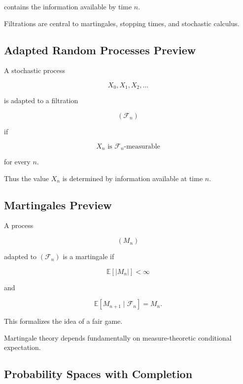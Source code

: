 contains the information available by time \(n\).

Filtrations are central to martingales, stopping times, and stochastic
calculus.

\subsection{Adapted Random Processes Preview}
\label{subsec:adapted-processes-preview}

A stochastic process

\[
X_0,X_1,X_2,\ldots
\]

is adapted to a filtration

\[
(\mathcal{F}_n)
\]

if

\[
\boxed{
X_n
\text{ is }\mathcal{F}_n\text{-measurable}
}
\]

for every \(n\).

Thus the value \(X_n\) is determined by information available at time
\(n\).

\subsection{Martingales Preview}
\label{subsec:martingales-measure-preview}

A process

\[
(M_n)
\]

adapted to \((\mathcal{F}_n)\) is a martingale if

\[
\mathbb{E}[|M_n|]<\infty
\]

and

\[
\boxed{
\mathbb{E}[M_{n+1}\mid\mathcal{F}_n]
=
M_n.
}
\]

This formalizes the idea of a fair game.

Martingale theory depends fundamentally on measure-theoretic conditional
expectation.

\subsection{Probability Spaces with Completion}
\label{subsec:completed-probability-space}

